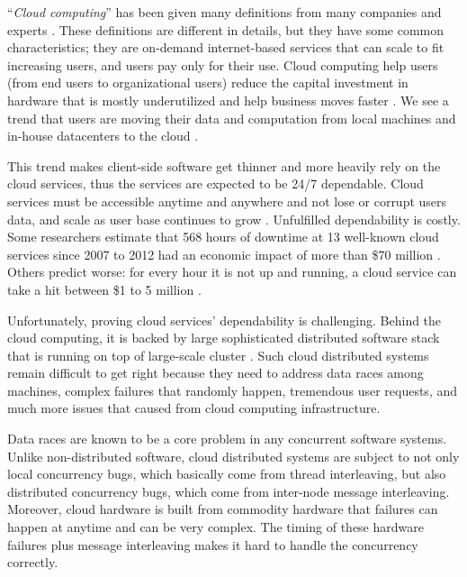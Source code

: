 ``\textit{Cloud computing}'' has been given many definitions from many companies
and experts \cite{TwentyoneCloudDef, IBMCloudDef, PCMagCloudDef,
Foster+08-CloudAndGrid}. These definitions are different in details, but they
have some common characteristics; they are on-demand internet-based services
that can scale to fit increasing users, and users pay only for their use.
%
Cloud computing help users (from end users to organizational users) reduce the
capital investment in hardware that is mostly underutilized
\cite{Hayes+08-CloudComputing} and help business moves faster
\cite{Marston+11-CloudBusiness}. We see a trend that users are moving their data
and computation from local machines and in-house datacenters to the cloud
\cite{AdobeCloudStat, AWSCustomer, GmailStat, GoogleDriveStat, DropboxStat,
AstroInCloud, FacebookStat, Luo+16-BigDataBioResearch}.

This trend makes client-side software get thinner and more heavily rely on the
cloud services, thus the services are expected to be 24/7 dependable. Cloud
services must be accessible anytime and anywhere and not lose or corrupt users
data, and scale as user base continues to grow \cite{Buyya+09-Cloud5thUtil}.
%
Unfulfilled dependability is costly. Some researchers estimate that 568 hours of
downtime at 13 well-known cloud services since 2007 to 2012 had an economic
impact of more than \$70 million \cite{Essers12-70Million}. Others predict
worse: for every hour it is not up and running, a cloud service can take a hit
between \$1 to 5 million \cite{Linthicum13-InfoworldCostOutages}.

Unfortunately, proving cloud services' dependability is challenging. Behind the
cloud computing, it is backed by large sophisticated distributed software stack
\cite{Burrows06-Chubby, Chang+06-BigTable, Chapin+95-Hive, Corbett+12-Spanner,
DeanGhemawat04-MapReduce, DeCandia+07-Dynamo, Ghemawat+03-GoogleFS,
Hunt+10-ZooKeeperPaper, Lakshman+09-Cassandra, Melnik+10-DremelInteractive,
Zaharia+12-RDD} that is running on top of large-scale cluster
\cite{WikiCassandra, RunningNetflix13, LargestHadoop}.  Such cloud distributed
systems remain difficult to get right because they need to address data races
among machines, complex failures that randomly happen, tremendous user
requests, and much more issues that caused from cloud computing infrastructure.

Data races are known to be a core problem in any concurrent software systems.
Unlike non-distributed software, cloud distributed systems are subject to not
only local concurrency bugs, which basically come from thread interleaving, but
also distributed concurrency bugs, which come from inter-node message
interleaving.  Moreover, cloud hardware is built from commodity hardware that
failures can happen at anytime and can be very complex. The timing of these
hardware failures plus message interleaving makes it hard to handle the
concurrency correctly.

